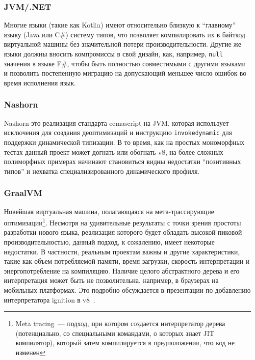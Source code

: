 \documentclass[times,specification,annotation]{itmo-student-thesis}
\begin{document}
\subsubsection{JVM/.NET}
Многие языки (такие как Kotlin) имеют относительно близкую к ``главному'' языку (Java или C\#) систему типов, что позволяет компилировать их в байткод виртуальной машины без значительной потери производительности. Другие же языки должны вносить компромиссы в свой дизайн, как, например, \texttt{null} значения в языке F\#, чтобы быть полностью совместимыми с другими языками и позволить постепенную миграцию на допускающий меньшее число ошибок во время исполнения язык.
\subsubsection{Nashorn}
Nashorn это реализация стандарта ecmascript на JVM, которая использует исключения для создания деоптимизаций и инструкцию \texttt{invokedynamic} для поддержки динамической типизации. В то время, как на простых мономорфных тестах данный проект может догнать или обогнать v8, на более сложных полиморфных примерах начинают становиться видны недостатки ``позитивных типов'' и нехватка специализированного динамического профиля.

\subsubsection{GraalVM}
Новейшая виртуальная машина, полагающаяся на мета-трассирующие оптимизации\footnote{Meta tracing~--- подход, при котором создается интерпретатор дерева (потенциально, со специальными командами, о которых знает JIT компилятор), который затем компилируется в предположении, что код не изменен}. Несмотря на удивительные результаты с точки зрения простоты разработки нового языка, реализация которого будет обладать высокой пиковой производительностью, данный подход, к сожалению, имеет некоторые недостатки. В частности, реальным проектам важны и другие характеристики, такие как объем потребляемой памяти, время загрузки, скорость интерпретации и энергопотребление на компиляцию. Наличие целого абстрактного дерева и его интерпретация может быть не позволительна, например, в браузерах на мобильных платформах. Это подробно обсуждается в презентации по добавлению интерпретатора ignition в v8~\cite{ignition-iterpreter}.
\end{document}
